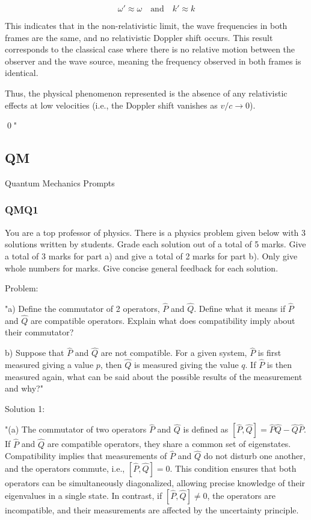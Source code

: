 \[
\omega' \approx \omega \quad \text{and} \quad k' \approx k
\]

This indicates that in the non-relativistic limit, the wave frequencies in both frames are the same, and no relativistic Doppler shift occurs. This result corresponds to the classical case where there is no relative motion between the observer and the wave source, meaning the frequency observed in both frames is identical.

Thus, the physical phenomenon represented is the absence of any relativistic effects at low velocities (i.e., the Doppler shift vanishes as \( v/c \to 0 \)).

\qed"


\subsection{QM}

Quantum Mechanics Prompts

\subsubsection{QMQ1}

You are a top professor of physics. There is a physics problem given below with 3 solutions written by students. Grade each solution out of a total of 5 marks. Give a total of 3 marks for part a) and give a total of 2 marks for part b). Only give whole numbers for marks. Give concise general feedback for each solution. 

Problem: 

"a) Define the commutator of 2 operators, \( \hat{P} \) and \( \hat{Q} \). Define what it means if \( \hat{P} \) and \( \hat{Q} \) are compatible operators. Explain what does compatibility imply about their commutator?

b) Suppose that \( \hat{P} \) and \( \hat{Q} \) are not compatible. For a given system, \( \hat{P} \) is first measured giving a value \( p \), then \( \hat{Q} \) is measured giving the value \( q \). If \( \hat{P} \) is then measured again, what can be said about the possible results of the measurement and why?"

Solution 1:

"(a) The commutator of two operators $\hat{P}$ and $\hat{Q}$ is defined as $[\hat{P}, \hat{Q}] = \hat{P}\hat{Q} - \hat{Q}\hat{P}$. If $\hat{P}$ and $\hat{Q}$ are compatible operators, they share a common set of eigenstates. Compatibility implies that measurements of $\hat{P}$ and $\hat{Q}$ do not disturb one another, and the operators commute, i.e., $[\hat{P}, \hat{Q}] = 0$. This condition ensures that both operators can be simultaneously diagonalized, allowing precise knowledge of their eigenvalues in a single state. In contrast, if $[\hat{P}, \hat{Q}] \neq 0$, the operators are incompatible, and their measurements are affected by the uncertainty principle.

